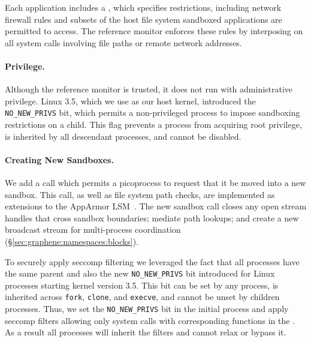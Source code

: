 Each application includes a , which specifies restrictions,
including network firewall rules and subsets of the host file system sandboxed
applications are permitted to access.  The reference monitor enforces these
rules by interposing on all system calls involving file paths or remote network addresses.

\paragraph{Privilege.~} 
Although the reference monitor is trusted, it does not run 
with administrative privilege.
Linux 3.5, which we use as our host kernel, 
introduced the {\tt NO\_NEW\_PRIVS} bit, which permits
a non-privileged process to impose sandboxing restrictions on a child.
This flag prevents a process from acquiring root privilege, %
is inherited by all descendant processes,
and cannot be disabled.

\paragraph{Creating New Sandboxes.~} We add a \pal{} call which
permits a picoprocess to request that it be moved into a new sandbox.
This call, as well as file system path checks, are implemented
as extensions to the  AppArmor LSM~\citep{apparmor}.
The new sandbox call closes any open stream handles that cross sandbox boundaries;
mediate path lookups;
and create a new broadcast stream for multi-process
 coordination (\S\ref{sec:graphene:namespaces:blocks}).

To securely apply seccomp filtering we leveraged the fact that all
\sysname{} processes have the same parent and also the new
{\tt NO\_NEW\_PRIVS} bit introduced for Linux processes starting kernel
version 3.5. This bit can be set by any process, is inherited across
{\tt fork}, {\tt clone}, and {\tt execve}, and cannot be unset by
children processes. Thus, we set the {\tt NO\_NEW\_PRIVS} bit in the initial
\sysname{} process and apply seccomp filters allowing only system calls
with corresponding functions in the \pal{}. As a result all \sysname{}
processes will inherit the filters and cannot relax or bypass it.



